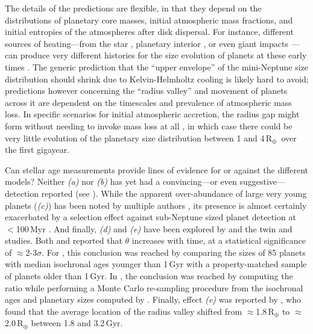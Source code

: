 \documentclass[12pt,twocolumn,tighten]{aastex63}
\newcommand{\rearth}{{R$_\oplus$}}
\begin{document}
The details of the predictions are flexible, in that they depend on
the distributions of planetary core masses, initial atmospheric mass
fractions, and initial entropies of the atmospheres after disk
dispersal.  For instance, different sources of heating---from the star
\citep{Owen_Wu_2013,Lopez_Fortney_2014,Jin_2014}, planetary interior
\citep{Gupta_2019}, or even giant impacts
\citep{Biersteker_Schlichting_2019}---can produce very different
histories for the size evolution of planets at these early times
\citep[e.g.][]{Owen_2020}.  The generic prediction that the ``upper
envelope'' of the mini-Neptune size distribution should shrink due to
Kelvin-Helmholtz cooling is likely hard to avoid; predictions however
concerning the ``radius valley'' and movement of planets across it are
dependent on the timescales and prevalence of atmospheric mass loss.
In specific scenarios for initial atmospheric accretion, the radius
gap might form without needing to invoke mass loss at all
\citep{Lee_2022}, in which case there could be very little evolution
of the planetary size distribution between 1 and 4\,\rearth\ over the
first gigayear.

Can stellar age measurements provide lines of evidence for or against
the different models?  Neither {\it (a)} nor {\it (b)} has yet had a
convincing---or even suggestive--- detection reported (see
\citealt{Petigura_2022}).  While the apparent over-abundance of large
very young planets ({\it (c)}) has been noted by multiple authors
\citep[e.g.][]{Bouma_2020,Mann_2022}, its presence is almost certainly
exacerbated by a selection effect against sub-Neptune sized planet
detection at $<$100\,Myr \citep{Zhou_2021,Bouma_2022}.  And finally,
{\it (d)} and {\it (e)} have been explored by
\citet{Berger_2020b_rpage} and the twin \citet{David_2021} and
\citet{Sandoval_2021} studies.  Both \citet{Berger_2020b_rpage} and
\citet{Sandoval_2021} reported that $\theta$ increases with time, at a
statistical significance of $\approx$2-3$\sigma$.  For
\citet{Berger_2020b_rpage}, this conclusion was reached by comparing
the sizes of 85 planets with median isochronal ages younger than
1\,Gyr with a property-matched sample of planets older than 1\,Gyr.
In \citet{Sandoval_2021}, the conclusion was reached by computing the
ratio while performing a Monte Carlo re-sampling procedure from the
isochronal ages and planetary sizes computed by
\citet{Fulton_Petigura_2018_cks_vii}.  Finally, effect {\it (e)} was
reported by \citet{David_2021}, who found that the average location of
the radius valley shifted from $\approx$1.8\,R$_\oplus$ to
$\approx$2.0\,R$_\oplus$ between 1.8 and 3.2\,Gyr.
\end{document}
